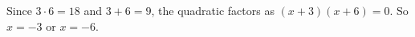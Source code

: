 Since $3\cdot6=18$ and $3+6=9$, the quadratic factors as $(x+3)(x+6)=0$. So $\boxed{x=-3\text{ or }x=-6}$.
